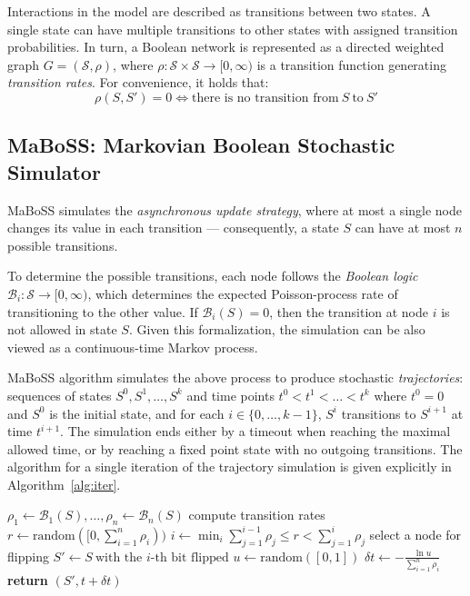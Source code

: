 \documentclass[sn-mathphys-num]{sn-jnl}%
\begin{document}
Interactions in the model are described as transitions between two states. A single state can have multiple transitions to other states with assigned transition probabilities. In turn, a Boolean network is represented as a directed weighted graph $G = (\mathcal{S}, \rho)$, where $\rho: \mathcal{S} \times \mathcal{S} \rightarrow [0, \infty)$ is a transition function generating \emph{transition rates}. For convenience, it holds that:
\[ \rho(S, S') = 0 \iff \text{there is no transition from}\ S\ \text{to}\ S' \]


\subsection{MaBoSS: Markovian Boolean Stochastic Simulator}
MaBoSS simulates the \emph{asynchronous update strategy}, where at most a single node changes its value in each transition --- consequently, a state $S$ can have at most $n$ possible transitions.

To determine the possible transitions, each node follows the \emph{Boolean logic} $\mathcal{B}_i: \mathcal{S} \rightarrow [0, \infty)$, which determines the expected Poisson-process rate of transitioning to the other value. If $\mathcal{B}_i(S) = 0$, then the transition at node $i$ is not allowed in state $S$.
Given this formalization, the simulation can be also viewed as a continuous-time Markov process.

MaBoSS algorithm simulates the above process to produce stochastic \emph{trajectories}: sequences of states $S^0, S^1, \dots, S^k$ and time points $t^0 < t^1 < \dots < t^k$ where $t^0 = 0$ and $S^0$ is the initial state, and for each $i \in \{0, \dots, k-1\}$, $S^i$ transitions to $S^{i+1}$ at time $t^{i+1}$. The simulation ends either by a timeout when reaching the maximal allowed time, or by reaching a fixed point state with no outgoing transitions. The algorithm for a single iteration of the trajectory simulation is given explicitly in Algorithm~\ref{alg:iter}.

\begin{algorithm}
\caption{A single iteration of the MaBoSS simulation of a trajectory, given the state $S$ and time $t$.}
\label{alg:iter}
\begin{algorithmic}[1]
\State $\rho_1 \gets \mathcal{B}_1(S), \dots, \rho_n \gets \mathcal{B}_n(S)$ \Comment compute transition rates
\State $r \gets \text{random}([0, \sum_{i=1}^n \rho_i))$
\State $i \gets \min_i \sum_{j=1}^{i-1} \rho_j \leq r < \sum_{j=1}^{i} \rho_j$ \Comment select a node for flipping
\State $S'\gets S\ \text{with the $i$-th bit flipped}$
\State $u \gets \text{random}([0, 1])$
\State $\delta t \gets -\frac{\ln u}{\sum_{i=1}^n \rho_i}$
\State \textbf{return} $(S', t + \delta t)$
\EndProcedure
\end{algorithmic}
\end{algorithm}
\end{document}
